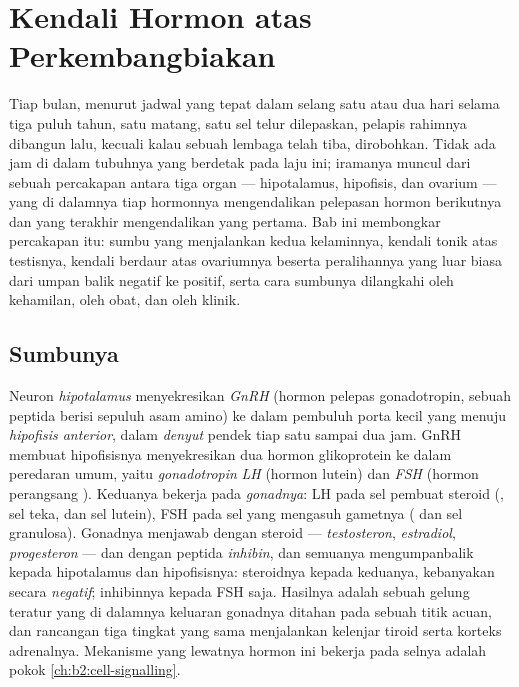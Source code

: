 \chapter{Kendali Hormon atas Perkembangbiakan}\label{ch:b2:reproductive-hormones}

Tiap bulan, menurut jadwal yang tepat dalam selang satu atau dua hari
selama tiga puluh tahun, satu  matang, satu sel telur
dilepaskan, pelapis rahimnya dibangun lalu, kecuali kalau sebuah
lembaga telah tiba, dirobohkan. Tidak ada jam di dalam tubuhnya yang
berdetak pada laju ini; iramanya muncul dari sebuah percakapan antara
tiga organ --- hipotalamus, hipofisis, dan ovarium --- yang di dalamnya
tiap hormonnya mengendalikan pelepasan hormon berikutnya dan yang
terakhir mengendalikan yang pertama. Bab ini membongkar percakapan itu:
sumbu yang menjalankan kedua kelaminnya, kendali tonik atas testisnya,
kendali berdaur atas ovariumnya beserta peralihannya yang luar biasa
dari umpan balik negatif ke positif, serta cara sumbunya dilangkahi
oleh kehamilan, oleh obat, dan oleh klinik.

\section{Sumbunya}

\begin{definition}\label{def:b2:reproductive-hormones:axis}
%
Neuron \emph{hipotalamus} menyekresikan \emph{GnRH}
(hormon pelepas gonadotropin, sebuah peptida berisi sepuluh asam amino)
ke dalam pembuluh porta kecil yang menuju \emph{hipofisis anterior},
dalam \emph{denyut} pendek tiap satu sampai dua jam. GnRH membuat
hipofisisnya menyekresikan dua hormon glikoprotein ke dalam peredaran
umum, yaitu \emph{gonadotropin} \emph{LH} (hormon lutein) dan
\emph{FSH} (hormon perangsang ). Keduanya bekerja pada
\emph{gonadnya}: LH pada sel pembuat steroid (,
sel teka, dan sel lutein), FSH pada sel yang mengasuh gametnya
( dan sel granulosa). Gonadnya menjawab dengan steroid ---
\emph{testosteron}, \emph{estradiol}, \emph{progesteron} --- dan
dengan peptida \emph{inhibin}, dan semuanya mengumpanbalik kepada
hipotalamus dan hipofisisnya: steroidnya kepada keduanya, kebanyakan
secara \emph{negatif}; inhibinnya kepada FSH saja. Hasilnya adalah
sebuah gelung teratur yang di dalamnya keluaran gonadnya ditahan pada
sebuah titik acuan, dan rancangan tiga tingkat yang sama menjalankan
kelenjar tiroid serta korteks adrenalnya. Mekanisme yang lewatnya
hormon ini bekerja pada selnya adalah pokok
\cref{ch:b2:cell-signalling}.
\end{definition}

